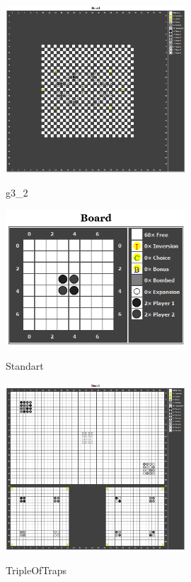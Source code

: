 \begin{figure}[H]
	\centering
	\includegraphics[width=0.6\textwidth,keepaspectratio]{g3_2}\\
	\caption{g3\_2}
\end{figure}

\begin{figure}[H]
	\centering
	\includegraphics[width=0.6\textwidth,keepaspectratio]{reversi.png}\\
	\caption{Standart}
\end{figure}

\begin{figure}[H]
	\centering
	\includegraphics[width=0.6\textwidth,keepaspectratio]{TripleOfTraps.png}\\
	\caption{TripleOfTraps}
\end{figure}

